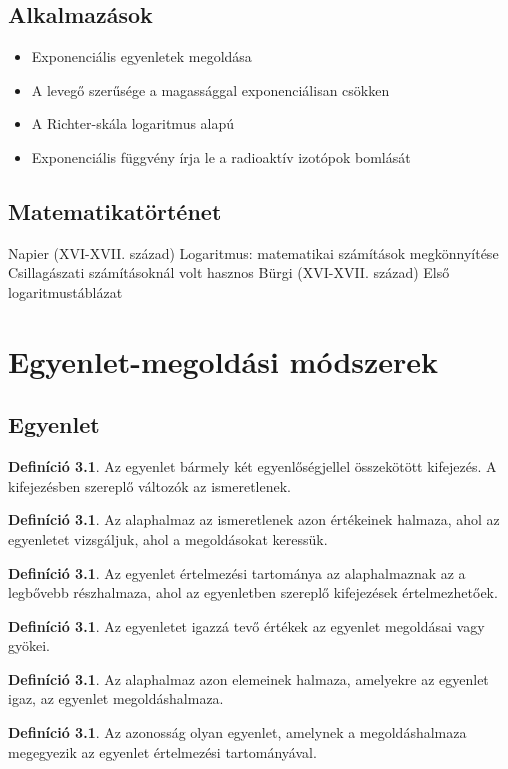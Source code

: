\documentclass[twoside,12pt]{report}
\theoremstyle{definition}
\newtheorem{definition}[theorem]{Definíció}
\begin{document}
\section{Alkalmazások}
	\begin{itemize}
		\item Exponenciális egyenletek megoldása
		\item A levegő szerűsége a magassággal exponenciálisan csökken
		\item A Richter-skála logaritmus alapú
		\item Exponenciális függvény írja le a radioaktív izotópok bomlását
	\end{itemize}
\section{Matematikatörténet}
	\begin{outline}
		\1 Napier (XVI-XVII. század)
			\2 Logaritmus: matematikai számítások megkönnyítése
			\2 Csillagászati számításoknál volt hasznos
		\1 Bürgi (XVI-XVII. század)
			\2 Első logaritmustáblázat
	\end{outline}
\chapter{Egyenlet-megoldási módszerek}
\section{Egyenlet}
	\begin{definition}
		Az egyenlet bármely két egyenlőségjellel összekötött kifejezés. A kifejezésben szereplő
		változók az ismeretlenek.
	\end{definition}
	\begin{definition}
		Az alaphalmaz az ismeretlenek azon értékeinek halmaza, ahol az egyenletet vizsgáljuk,
		ahol a megoldásokat keressük.
	\end{definition}
	\begin{definition}
		Az egyenlet értelmezési tartománya az alaphalmaznak az a legbővebb részhalmaza,
		ahol az egyenletben szereplő kifejezések értelmezhetőek.
	\end{definition}
	\begin{definition}
		Az egyenletet igazzá tevő értékek az egyenlet megoldásai vagy gyökei.
	\end{definition}
	\begin{definition}
		Az alaphalmaz azon elemeinek halmaza, amelyekre az egyenlet igaz, az egyenlet megoldáshalmaza.
	\end{definition}
	\begin{definition}
		Az azonosság olyan egyenlet, amelynek a megoldáshalmaza megegyezik az egyenlet
		értelmezési tartományával.
	\end{definition}
\pagebreak
\end{document}
